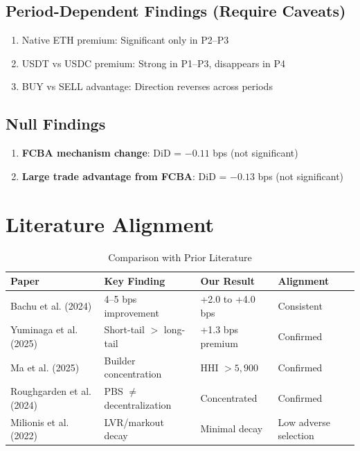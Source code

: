 \documentclass[11pt,a4paper]{article}
\begin{document}
\subsection{Period-Dependent Findings (Require Caveats)}

\begin{enumerate}
    \item Native ETH premium: Significant only in P2--P3
    \item USDT vs USDC premium: Strong in P1--P3, disappears in P4
    \item BUY vs SELL advantage: Direction reverses across periods
\end{enumerate}

\subsection{Null Findings}

\begin{enumerate}
    \item \textbf{FCBA mechanism change}: DiD = $-0.11$ bps (not significant)
    \item \textbf{Large trade advantage from FCBA}: DiD = $-0.13$ bps (not significant)
\end{enumerate}

\section{Literature Alignment}

\begin{table}[H]
\centering
\caption{Comparison with Prior Literature}
\begin{tabular}{llll}
\toprule
\textbf{Paper} & \textbf{Key Finding} & \textbf{Our Result} & \textbf{Alignment} \\
\midrule
Bachu et al. (2024) & 4--5 bps improvement & +2.0 to +4.0 bps & Consistent \\
Yuminaga et al. (2025) & Short-tail $>$ long-tail & +1.3 bps premium & Confirmed \\
Ma et al. (2025) & Builder concentration & HHI $> 5,900$ & Confirmed \\
Roughgarden et al. (2024) & PBS $\neq$ decentralization & Concentrated & Confirmed \\
Milionis et al. (2022) & LVR/markout decay & Minimal decay & Low adverse selection \\
\bottomrule
\end{tabular}
\end{table}
\end{document}
